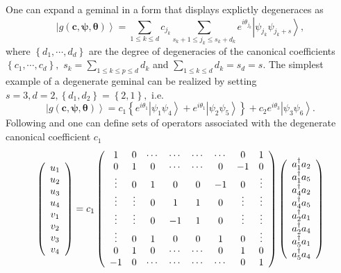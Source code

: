 \documentclass[aps,preprint]{revtex4}%
\begin{document}
One can expand a geminal in a form that displays explictly degeneraces as
\begin{equation}
\left\vert g\left(  \bm{c},\bm{\psi,\theta}\right)  \right\rangle =\sum_{1\leq
k\leq d}c_{j_{k}}\sum_{s_{k}+1\leq j_{k}\leq s_{k}+d_{k}}e^{i\theta_{j_{k}}%
}\left\vert \psi_{j_{k}}\psi_{j_{k}+s}\right\rangle ,
\end{equation}
where $\left\{  d_{1},\cdots,d_{d}\right\}  $ are the degree of degeneracies
of the canonical coefficients $\left\{  c_{1},\cdots,c_{d}\right\}  ,$
$s_{k}=\sum\limits_{1\leq k\leq p\leq d}d_{k}$ and $\sum\limits_{1\leq k\leq
d}d_{k}=s_{d}=s.$ The simplest example of a degenerate geminal can be realized
by setting $s=3,d=2,\left\{  d_{1},d_{2}\right\}  =\left\{  2,1\right\}  ,$
i.e.
\begin{equation}
\left\vert g\left(  \bm{c},\bm{\psi,\theta}\right)  \right\rangle
=c_{1}\left\{  e^{i\theta_{1}}\left\vert \psi_{1}\psi_{4}\right\rangle
+e^{i\theta_{1}}\left\vert \psi_{2}\psi_{5}\right\rangle \right\}
+c_{2}e^{i\theta_{3}}\left\vert \psi_{3}\psi_{6}\right\rangle .
\end{equation}
Following \cite{AGPCoherent} and \cite{OrtizWeiner2006} one can define sets of
operators associated with the degenerate canonical coefficient $c_{1}$%
\begin{equation}
\left(
\begin{array}
[c]{c}%
u_{1}\\
u_{2}\\
u_{3}\\
u_{4}\\
v_{1}\\
v_{2}\\
v_{3}\\
v_{4}%
\end{array}
\right)  =c_{1}\left(
\begin{array}
[c]{cccccccc}%
1 & 0 & \cdots & \cdots & \cdots & \cdots & 0 & 1\\
0 & 1 & 0 & \cdots & \cdots & 0 & -1 & 0\\
\vdots & 0 & 1 & 0 & 0 & -1 & 0 & \vdots\\
\vdots & \vdots & 0 & 1 & 1 & 0 & \vdots & \vdots\\
\vdots & \vdots & 0 & -1 & 1 & 0 & \vdots & \vdots\\
\vdots & 0 & 1 & 0 & 0 & 1 & 0 & \vdots\\
0 & 1 & 0 & \cdots & \cdots & 0 & 1 & 0\\
-1 & 0 & \cdots & \cdots & \cdots & \cdots & 0 & 1
\end{array}
\right)  \left(
\begin{array}
[c]{c}%
a_{1}^{\dagger}a_{2}\\
a_{1}^{\dagger}a_{5}\\
a_{4}^{\dagger}a_{2}\\
a_{4}^{\dagger}a_{5}\\
a_{2}^{\dagger}a_{1}\\
a_{2}^{\dagger}a_{4}\\
a_{5}^{\dagger}a_{1}\\
a_{5}^{\dagger}a_{4}%
\end{array}
\right)
\end{equation}
\end{document}
